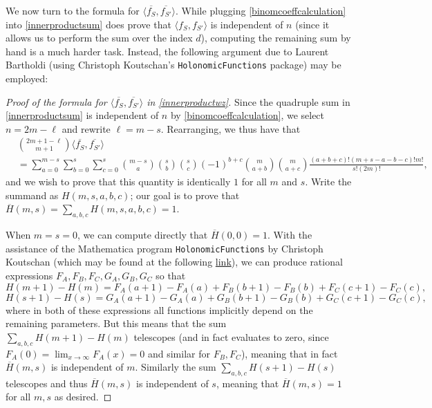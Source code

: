 \documentclass[11pt]{article}
\newcounter{r}
\newcounter{s}
\numberwithin{equation}{section}
\begin{document}
We now turn to the formula for $\langle \overline{f_S}, \overline{f_{S'}} \rangle$. While plugging \cref{binomcoeffcalculation} into \cref{innerproductsum} does prove that $\langle f_S, f_{S'} \rangle$ is independent of $n$ (since it allows us to perform the sum over the index $d$), computing the remaining sum by hand is a much harder task. Instead, the following argument due to Laurent Bartholdi (using Christoph Koutschan's \texttt{HolonomicFunctions} package) may be employed:

\begin{proof}[Proof of the formula for $\langle \overline{f_S}, \overline{f_{S'}} \rangle$ in \cref{innerproductwz}]
Since the quadruple sum in \cref{innerproductsum} is independent of $n$ by \cref{binomcoeffcalculation}, we select $n = 2m - \ell$ and rewrite $\ell = m-s$. Rearranging, we thus have that
\begin{align*}
    &\binom{2m+1-\ell}{m+1} \langle \overline{f_S}, \overline{f_{S'}} \rangle \\
    &= \sum_{a=0}^{m-s} \sum_{b=0}^{s} \sum_{c=0}^{s} \binom{m-s}{a} \binom{s}{b} \binom{s}{c} (-1)^{b+c} \binom{m}{a+b} \binom{m}{a+c} \frac{(a+b+c)!(m+s-a-b-c)!m!}{s!(2m)!},
\end{align*}
and we wish to prove that this quantity is identically $1$ for all $m$ and $s$. Write the summand as $H(m, s, a, b, c)$; our goal is to prove that $\overline{H}(m, s) = \sum_{a, b, c} H(m, s, a, b, c) = 1$.

When $m = s = 0$, we can compute directly that $\overline{H}(0, 0) = 1$. With the assistance of the Mathematica program \texttt{HolonomicFunctions} by Christoph Koutschan (which may be found at the following \href{https://www3.risc.jku.at/research/combinat/software/ergosum/RISC/HolonomicFunctions.html}{link}), we can produce rational expressions $F_A, F_B, F_C, G_A, G_B, G_C$ so that 
\[
    H(m+1) - H(m) = F_A(a+1) - F_A(a) + F_B(b+1) - F_B(b) + F_C(c+1) - F_C(c),
\]
\[
    H(s+1) - H(s) = G_A(a+1) - G_A(a) + G_B(b+1) - G_B(b) + G_C(c+1) - G_C(c),
\]
where in both of these expressions all functions implicitly depend on the remaining parameters. But this means that the sum $\sum_{a, b, c} H(m+1) - H(m)$ telescopes (and in fact evaluates to zero, since $F_A(0) = \lim_{x \to \infty} F_A(x) = 0$ and similar for $F_B, F_C$), meaning that in fact $\overline{H}(m, s)$ is independent of $m$. Similarly the sum $\sum_{a, b, c} H(s+1) - H(s)$ telescopes and thus $\overline{H}(m, s)$ is independent of $s$, meaning that $\overline{H}(m, s) = 1$ for all $m, s$ as desired. 
\end{proof}
\end{document}
